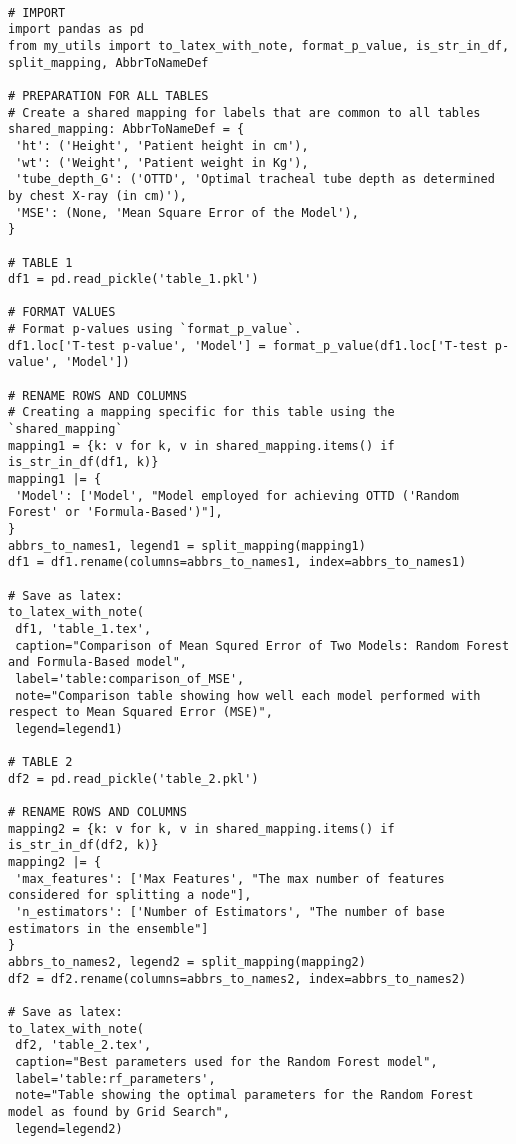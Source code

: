 \documentclass[11pt]{article}
\begin{document}
\begin{verbatim}

# IMPORT
import pandas as pd
from my_utils import to_latex_with_note, format_p_value, is_str_in_df, split_mapping, AbbrToNameDef

# PREPARATION FOR ALL TABLES
# Create a shared mapping for labels that are common to all tables
shared_mapping: AbbrToNameDef = {
 'ht': ('Height', 'Patient height in cm'),
 'wt': ('Weight', 'Patient weight in Kg'),
 'tube_depth_G': ('OTTD', 'Optimal tracheal tube depth as determined by chest X-ray (in cm)'),
 'MSE': (None, 'Mean Square Error of the Model'),
}

# TABLE 1
df1 = pd.read_pickle('table_1.pkl')

# FORMAT VALUES
# Format p-values using `format_p_value`.
df1.loc['T-test p-value', 'Model'] = format_p_value(df1.loc['T-test p-value', 'Model'])

# RENAME ROWS AND COLUMNS
# Creating a mapping specific for this table using the `shared_mapping`
mapping1 = {k: v for k, v in shared_mapping.items() if is_str_in_df(df1, k)} 
mapping1 |= {
 'Model': ['Model', "Model employed for achieving OTTD ('Random Forest' or 'Formula-Based')"],
}
abbrs_to_names1, legend1 = split_mapping(mapping1)
df1 = df1.rename(columns=abbrs_to_names1, index=abbrs_to_names1)

# Save as latex:
to_latex_with_note(
 df1, 'table_1.tex',
 caption="Comparison of Mean Squred Error of Two Models: Random Forest and Formula-Based model", 
 label='table:comparison_of_MSE',
 note="Comparison table showing how well each model performed with respect to Mean Squared Error (MSE)",
 legend=legend1)

# TABLE 2
df2 = pd.read_pickle('table_2.pkl')

# RENAME ROWS AND COLUMNS 
mapping2 = {k: v for k, v in shared_mapping.items() if is_str_in_df(df2, k)} 
mapping2 |= {
 'max_features': ['Max Features', "The max number of features considered for splitting a node"],
 'n_estimators': ['Number of Estimators', "The number of base estimators in the ensemble"]
}
abbrs_to_names2, legend2 = split_mapping(mapping2)
df2 = df2.rename(columns=abbrs_to_names2, index=abbrs_to_names2)

# Save as latex:
to_latex_with_note(
 df2, 'table_2.tex',
 caption="Best parameters used for the Random Forest model", 
 label='table:rf_parameters',
 note="Table showing the optimal parameters for the Random Forest model as found by Grid Search",
 legend=legend2)

\end{verbatim}
\end{document}
